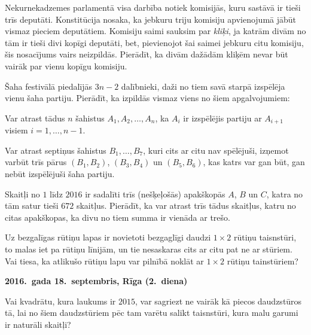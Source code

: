 \documentclass[11pt]{article}
\newcounter{alphnum}
\newenvironment{alphlist}{\begin{list}{(\Alph{alphnum})}{\usecounter{alphnum}\setlength{\leftmargin}{2.5em}} \rm}{\end{list}}
\begin{document}
\begin{problem}[BwTst2016.7]
Nekurnekadzemes parlamentā visa darbība notiek komisijās, kuru 
sastāvā ir tieši trīs deputāti. Konstitūcija nosaka, ka jebkuru triju 
komisiju apvienojumā jābūt vismaz pieciem deputātiem. 
Komisiju saimi sauksim par {\em kliķi}, ja katrām divām no tām 
ir tieši divi kopīgi deputāti, 
bet, pievienojot šai saimei jebkuru citu komisiju, šis nosacījums
vairs neizpildās. 
Pierādīt, ka divām dažādām kliķēm nevar būt vairāk par vienu kopīgu komisiju. 
\end{problem}

\begin{problem}[BwTst2016.8]
Šaha festivālā piedalījās $3n - 2$ dalībnieki, daži no tiem savā starpā izspēlēja vienu 
šaha partiju. Pierādīt, ka izpildās vismaz viens no šiem apgalvojumiem:
\begin{alphlist}
\item Var atrast tādus $n$ šahistus $A_1,A_2,\ldots,A_n$, ka $A_i$ ir izspēlējis partiju ar 
$A_{i+1}$ visiem $i = 1,\ldots,n-1$. 
\item Var atrast septiņus šahistus $B_1,\ldots,B_7$, kuri cits ar citu nav spēlējuši, izņemot 
varbūt trīs pārus $(B_1,B_2)$, $(B_3,B_4)$ un $(B_5,B_6)$, kas katrs var gan būt, 
gan nebūt izspēlējuši šaha partiju. 
\end{alphlist}
\end{problem}

\begin{problem}[BwTst2016.9]
Skaitļi no $1$ līdz $2016$ ir sadalīti trīs (nešķeļošās) apakškopās $A$, $B$ un $C$, 
katra no tām satur tieši $672$ skaitļus. 
Pierādīt, ka var atrast trīs tādus skaitļus, katru no citas apakškopas, ka divu 
no tiem summa ir vienāda ar trešo. 
\end{problem}

\begin{problem}[BwTst2016.10]
Uz bezgalīgas rūtiņu lapas ir novietoti bezgaglīgi daudzi $1 \times 2$ rūtiņu taisnstūri, 
to malas iet pa rūtiņu līnijām, un tie nesaskaras cits ar citu pat ne ar stūriem. 
Vai tiesa, ka atlikušo rūtiņu lapu var pilnībā noklāt ar $1 \times 2$ rūtiņu tainstūriem?
\end{problem}


\begin{center}
{\bf 2016.\ gada 18.\ septembris, Rīga (2.\ diena)}
\end{center}

\begin{problem}[BwTst2016.11]
Vai kvadrātu, kura laukums ir $2015$, var sagriezt ne vairāk kā piecos
daudzstūros tā, lai no šiem daudzstūriem pēc tam varētu salikt taisnstūri, kura malu garumi ir naturāli skaitļi? 
\end{problem}
\end{document}

